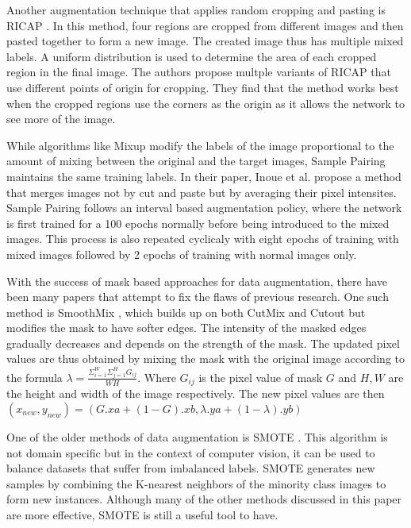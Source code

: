 Another augmentation technique that applies random cropping and pasting is RICAP \cite{takahashiDataAugmentationUsing2020}. In this method, four regions are cropped from different images and then pasted together to form a new image. The created image thus has multiple mixed labels. A uniform distribution is used to determine the area of each cropped region in the final image. The authors propose multple variants of RICAP that use different points of origin for cropping. They find that the method works best when the cropped regions use the corners as the origin as it allows the network to see more of the image.

While algorithms like Mixup \cite{zhangMixupEmpiricalRisk2018} modify the labels of the image proportional to the amount of mixing between the original and the target images, Sample Pairing \cite{inoueDataAugmentationPairing2018} maintains the same training labels. In their paper, Inoue et al. propose a method that merges images not by cut and paste but by averaging their pixel intensites. Sample Pairing follows an interval based augmentation policy, where the network is first trained for a 100 epochs normally before being introduced to the mixed images. This process is also repeated cyclicaly with eight epochs of training with mixed images followed by 2 epochs of training with normal images only.

With the success of mask based approaches for data augmentation, there have been many papers that attempt to fix the flaws of previous research. One such method is SmoothMix \cite{leeSmoothMixSimpleEffective2020}, which builds up on both CutMix \cite{yunCutMixRegularizationStrategy2019} and Cutout \cite{devriesImprovedRegularizationConvolutional2017} but modifies the mask to have softer edges. The intensity of the masked edges gradually decreases and depends on the strength of the mask. The updated pixel values are thus obtained by mixing the mask with the original image according to the formula $\lambda= \frac{\Sigma_{i=1}^{W}\Sigma_{j=1}^{H}G_{ij}}{WH}$. Where $G_{ij}$ is the pixel value of mask $G$ and $H,W$ are the height and width of the image respectively. The new pixel values are then $(x_{new} , y_{new}) = (G.xa + (1 - G).xb , \lambda.ya + (1 - \lambda).yb)$

One of the older methods of data augmentation is SMOTE \cite{SMOTESyntheticMinority}. This algorithm is not domain specific but in the context of computer vision, it can be used to balance datasets that suffer from imbalanced labels. SMOTE generates new samples by combining the K-nearest neighbors of the minority class images to form new instances. Although many of the other methods discussed in this paper are more effective, SMOTE is still a useful tool to have.

